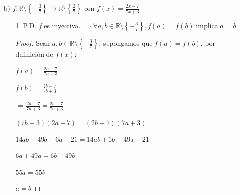 \documentclass{article}
\begin{document}
\begin{enumerate}
\begin{enumerate}
\begin{enumerate}
\begin{proof}
\begin{enumerate}
                                Por hipótesis de inducción, la propiedad \( p(a) \) se cumple para toda \( a \in \mathbb{N} \); y por extensión, la función no es suprayectiva, porque existe el valor \( b = 1 \) que no se puede alcanzar con ningún valor de \( a \in \mathbb{N} \).
                    \end{enumerate}
                    \end{proof}
                \item[3.] Como \(f\) no es suprayectiva, entonces no es biyectiva.
                \item[4.] Como \(f\) no es biyectiva, entonces no tiene función inversa.
            \end{enumerate}
            \vspace{\baselineskip}
            
        \item[b)] \( f: \mathbb{R} \setminus \left\{-\frac{3}{7}\right\} \rightarrow \mathbb{R} \setminus \left\{\frac{2}{7}\right\} \text{ con } f(x) = \frac{2x-7}{7x+3} \)
            \begin{enumerate}
            \item[1.] P.D. \( f \) es inyectiva.
                \(\Rightarrow \forall a, b \in \mathbb{R} \setminus \left\{-\frac{3}{7}\right\}, f(a) = f(b) \) implica \( a = b \)
                
                \begin{proof} Sean \( a, b \in \mathbb{R} \setminus \left\{-\frac{3}{7}\right\} \), supongamos que \( f(a) = f(b) \), por definición de \(f(x)\):
                
                \( f(a) = \frac{2a - 7}{7a + 3} \)
                
                \( f(b) = \frac{2b - 7}{7b + 3} \)
                \vspace{\baselineskip}
                
                \(\Rightarrow \frac{2a - 7}{7a + 3} = \frac{2b - 7}{7b + 3} \)
                
                \((7b + 3)(2a - 7) = (2b - 7)(7a + 3) \)
                
                \(14ab - 49b + 6a - 21 = 14ab + 6b - 49a - 21 \)
                
                \(6a + 49a = 6b + 49b \)
                
                \(55a = 55b \)
                
                \(a = b \)
                

\end{proof}
\end{enumerate}
\end{enumerate}
\end{enumerate}
\end{document}
